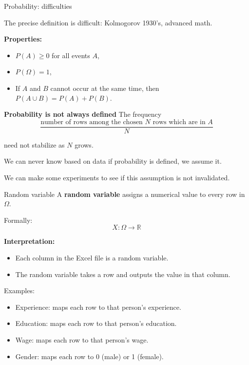 \documentclass{beamer}
\begin{document}
\begin{frame}{Probability: difficulties}
  
    The precise definition is difficult: Kolmogorov 1930's, advanced math.
    
\textbf{Properties:}
\begin{itemize}
    \item $P(A) \ge 0$ for all events $A$,
    \item $P(\Omega) = 1$,
    \item If $A$ and $B$ cannot occur at the same time,  
          then $P(A \cup B) = P(A) + P(B)$.
\end{itemize}

\bigskip

\textbf{Probability is not always defined}
   The frequency 
  \[ \frac{\mbox{number of rows among the chosen $N$ rows which are in $A$}}{N} \]

  need not stabilize as $N$ grows. 

 \medskip

 We can never know based on data if probability is defined, we assume it. 

 \medskip

 We can make some experiments to see if this assumption is not invalidated.


\end{frame}
\begin{frame}{Random variable}
A \textbf{random variable} assigns a numerical value to every row in $\Omega$.

\medskip

Formally:
\[
X: \Omega \to \mathbb{R}
\]

\medskip

\textbf{Interpretation:}
\begin{itemize}
    \item Each column in the Excel file is a random variable.
    \item The random variable takes a row and outputs the value in that column.
\end{itemize}

\medskip

Examples:
\begin{itemize}
    \item Experience: maps each row to that person's experience.
    \item Education: maps each row to that person's education.
    \item Wage: maps each row to that person's wage.
    \item Gender: maps each row to 0 (male) or 1 (female).
\end{itemize}

\end{frame}
\end{document}
